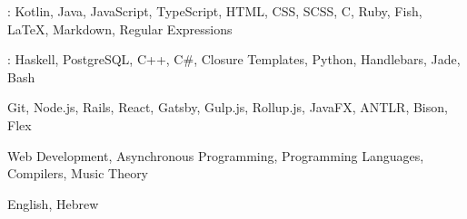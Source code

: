 
\begin{cvparagraph}
    : Kotlin, Java, JavaScript, TypeScript, HTML, CSS, SCSS, C, Ruby, Fish, LaTeX, Markdown, Regular Expressions

    : Haskell, PostgreSQL, C++, C\#, Closure Templates, Python, Handlebars, Jade, Bash

     Git, Node.js, Rails, React, Gatsby, Gulp.js, Rollup.js, JavaFX, ANTLR, Bison, Flex

     Web Development, Asynchronous Programming, Programming Languages, Compilers, Music Theory

     English, Hebrew
\end{cvparagraph}

